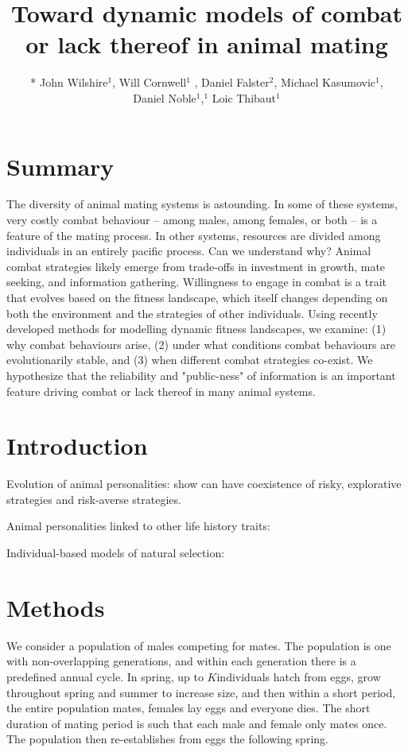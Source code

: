 \documentclass[a4paper,11pt]{article}
\title{Toward dynamic models of combat or lack thereof in animal mating}
\author{
* John Wilshire$^1$, Will Cornwell$^1$ , Daniel Falster$^2$, Michael Kasumovic$^1$, \\
Daniel Noble$^1$,$^1$ Loic Thibaut$^1$}
\affiliation{
*final list and order undecided\\
$^1$ University of NSW\\
$^2$ Macquarie University\\
}
\date{}
\begin{document}
\mstitlepage
\noindent

\section{Summary}
The diversity of animal mating systems is astounding. In some of these
systems, very costly combat behaviour -- among males, among females, or
both -- is a feature of the mating process.  In other systems, resources
are divided among individuals in an entirely pacific process.  Can we
understand why? Animal combat strategies likely emerge from trade-offs
in investment in growth, mate seeking, and information gathering.
Willingness to engage in combat is a trait that evolves based on the
fitness landscape, which itself changes depending on both the
environment and the strategies of other individuals.  Using recently
developed methods for modelling dynamic fitness landscapes, we examine:
(1) why combat behaviours arise, (2) under what conditions combat
behaviours are evolutionarily stable, and (3) when different combat
strategies co-exist.  We hypothesize that the reliability and
"public-ness" of information is an important feature driving combat or
lack thereof in many animal systems.

\section{Introduction}

Evolution of animal personalities: \citep{Wolf-2007,Wolf-2012} show can have
coexistence of risky, explorative strategies and risk-averse strategies.

Animal personalities linked to other life history traits: \citep{Biro-2008}

Individual-based models of natural selection: \citep{MGonigle-2012}


\section{Methods}


We consider a population of males competing for mates. The population is one with non-overlapping generations, and within each generation there is a predefined annual cycle. In spring, up to $K$individuals hatch from eggs, grow throughout spring and summer to increase size, and then within a short period, the entire population mates, females lay eggs and everyone dies. The short duration of mating period is such that each male and female only mates once. The population then re-establishes from eggs the following spring.
\end{document}
